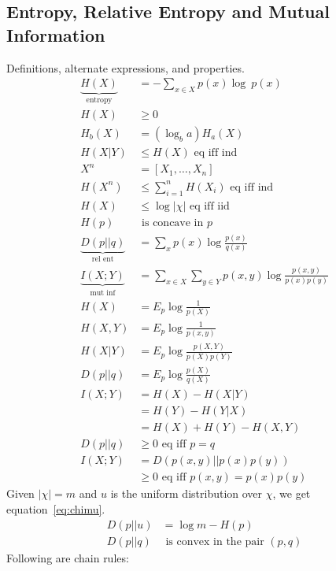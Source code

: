 \documentclass[10pt]{article}
\begin{document}
\begin{tiny}
\begin{multicols}{3}




\section*{Entropy, Relative Entropy and Mutual Information}
Definitions, alternate expressions, and properties.
\begin{align}
\underbrace{H(X)}_\text{entropy}&= -\sum_{x\in X} p(x) \log\ p(x) \label{eq:entropy}\\
H(X)& \geq 0\\
H_b(X)&= (\log_b a)H_a(X)\\
H(X|Y)& \leq  H(X)\text{ eq iff ind} \label{eq:conditioning}\\
X^n&=[X_1,\ldots,X_n]\\
H(X^n)& \leq \sum_{i=1}^n H(X_i)\text{ eq iff ind} \label{eq:jointsum}\\
H(X)&\leq  \log |\chi|  \text{ eq iff iid}\label{eq:alphabetentropy}\\
H(p)&\text{ is concave in $p$}\\
\underbrace{D(p||q)}_\text{rel ent} & = \sum_x p(x) \log \frac{p(x)}{q(x)}\\
\underbrace{I(X;Y)}_\text{mut inf} & = \sum_{x\in X} \sum_{y \in Y} p(x,y) \log \frac{p(x,y)}{p(x)p(y)}\\
H(X)&=E_p \log \frac{1}{p(X)}\\
H(X,Y)&=E_p\log \frac{1}{p(x,y)}\\
H(X|Y)&=E_p\log \frac{p(X,Y)}{p(X)p(Y)}\\
D(p||q)&=E_p\log \frac{p(X)}{q(X)}\\
I(X;Y)&=H(X)-H(X|Y)\\
&=H(Y)-H(Y|X)\\
&=H(X)+H(Y)-H(X,Y)\\
D(p||q)&\geq 0 \text{ eq iff $p=q$}\\
I(X;Y)&=D(p(x,y)||p(x)p(y))\\
	&\geq 0 \text{ eq iff $p(x,y)=p(x)p(y)$}
\end{align}
Given $|\chi|=m$ and $u$ is the uniform distribution over $\chi$, we get equation~\ref{eq:chimu}.
\begin{align}
D(p||u)&=\log m - H(p)\label{eq:chimu}\\
D(p||q)&\text{ is convex in the pair }(p,q)
\end{align}
Following are chain rules:
\begin{align}

\end{align}
\end{multicols}
\end{tiny}
\end{document}
